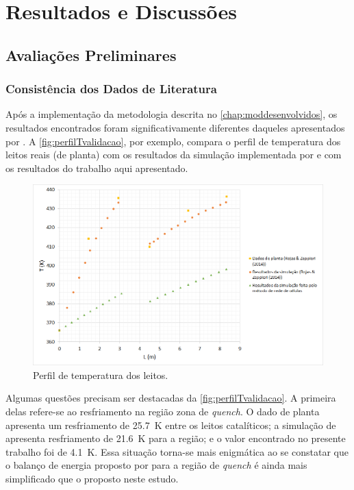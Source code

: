 %
% 
%
\chapter{Resultados e Discussões} \label{chap:resultados}

\section{Avaliações Preliminares} \label{sec:avaliacoesespreliminares}

\subsection{Consistência dos Dados de Literatura}
\label{sec:dadosliteratura}

Após a implementação da metodologia descrita no \autoref{chap:moddesenvolvidos},
os resultados encontrados foram significativamente diferentes daqueles apresentados
por . A \autoref{fig:perfilTvalidacao}, por
exemplo, compara o perfil de temperatura dos leitos reais (de planta) com os
resultados da simulação implementada por  e com os
resultados do trabalho aqui apresentado.

\begin{figure}[htb]
\centering \includegraphics[scale=0.4]{images/Chap4/perfilTvalidacao.png}
\caption{Perfil de temperatura dos leitos.}
\label{fig:perfilTvalidacao}
\end{figure}

Algumas questões precisam ser destacadas da \autoref{fig:perfilTvalidacao}.
A primeira delas refere-se ao resfriamento na região zona de \emph{quench}. O
dado de planta apresenta um resfriamento de \SI{25,7}{K} entre os leitos
catalíticos; a simulação de  apresenta resfriamento de
\SI{21,6}{K} para a região; e o valor encontrado no
presente trabalho foi de \SI{4,1}{K}. Essa situação torna-se mais enigmática ao
se constatar que o balanço de energia proposto por  para
a região de \emph{quench} é ainda mais simplificado que o proposto neste estudo.


